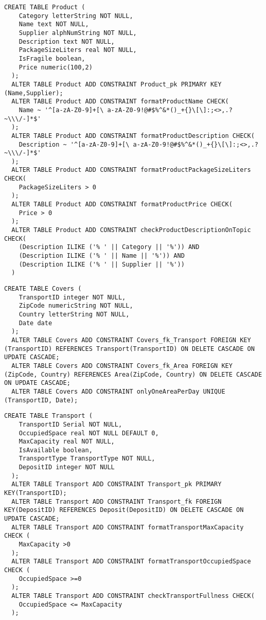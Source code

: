\begin{lstlisting}[caption={Creazione della tabella \textbf{Product}}]
  CREATE TABLE Product (
    Category letterString NOT NULL,
    Name text NOT NULL,
    Supplier alphNumString NOT NULL,
    Description text NOT NULL,
    PackageSizeLiters real NOT NULL,
    IsFragile boolean,
    Price numeric(100,2)
  );
  ALTER TABLE Product ADD CONSTRAINT Product_pk PRIMARY KEY (Name,Supplier);
  ALTER TABLE Product ADD CONSTRAINT formatProductName CHECK(
    Name ~ '^[a-zA-Z0-9]+[\ a-zA-Z0-9!@#$%^&*()_+{}\[\]:;<>,.?~\\\/-]*$'
  );
  ALTER TABLE Product ADD CONSTRAINT formatProductDescription CHECK(
    Description ~ '^[a-zA-Z0-9]+[\ a-zA-Z0-9!@#$%^&*()_+{}\[\]:;<>,.?~\\\/-]*$'
  );
  ALTER TABLE Product ADD CONSTRAINT formatProductPackageSizeLiters CHECK(
    PackageSizeLiters > 0
  );
  ALTER TABLE Product ADD CONSTRAINT formatProductPrice CHECK(
    Price > 0
  );
  ALTER TABLE Product ADD CONSTRAINT checkProductDescriptionOnTopic CHECK(
    (Description ILIKE ('% ' || Category || '%')) AND 
    (Description ILIKE ('% ' || Name || '%')) AND 
    (Description ILIKE ('% ' || Supplier || '%'))
  )
\end{lstlisting}

\begin{lstlisting}[caption={Creazione della tabella \textbf{Covers}}]
  CREATE TABLE Covers (
    TransportID integer NOT NULL,
    ZipCode numericString NOT NULL,
    Country letterString NOT NULL,
    Date date
  );
  ALTER TABLE Covers ADD CONSTRAINT Covers_fk_Transport FOREIGN KEY (TransportID) REFERENCES Transport(TransportID) ON DELETE CASCADE ON UPDATE CASCADE;
  ALTER TABLE Covers ADD CONSTRAINT Covers_fk_Area FOREIGN KEY (ZipCode, Country) REFERENCES Area(ZipCode, Country) ON DELETE CASCADE ON UPDATE CASCADE;
  ALTER TABLE Covers ADD CONSTRAINT onlyOneAreaPerDay UNIQUE (TransportID, Date);
\end{lstlisting}

\newpage
\begin{lstlisting}[caption={Creazione della tabella \textbf{Transport}}]
  CREATE TABLE Transport (
    TransportID Serial NOT NULL,
    OccupiedSpace real NOT NULL DEFAULT 0,
    MaxCapacity real NOT NULL,
    IsAvailable boolean, 
    TransportType TransportType NOT NULL,
    DepositID integer NOT NULL
  );
  ALTER TABLE Transport ADD CONSTRAINT Transport_pk PRIMARY KEY(TransportID);
  ALTER TABLE Transport ADD CONSTRAINT Transport_fk FOREIGN KEY(DepositID) REFERENCES Deposit(DepositID) ON DELETE CASCADE ON UPDATE CASCADE; 
  ALTER TABLE Transport ADD CONSTRAINT formatTransportMaxCapacity CHECK (
    MaxCapacity >0
  );
  ALTER TABLE Transport ADD CONSTRAINT formatTransportOccupiedSpace CHECK (
    OccupiedSpace >=0
  );
  ALTER TABLE Transport ADD CONSTRAINT checkTransportFullness CHECK(
    OccupiedSpace <= MaxCapacity
  );
\end{lstlisting}


